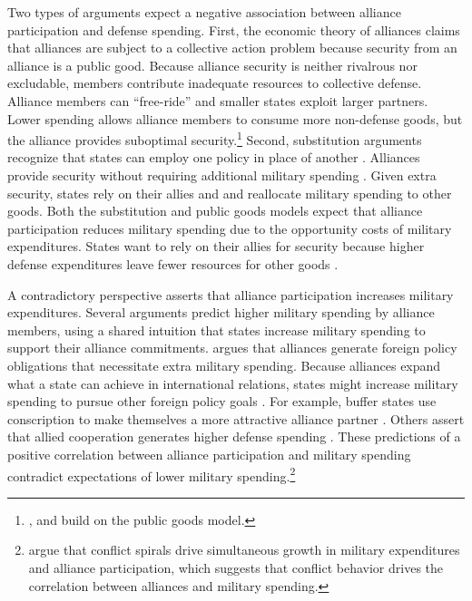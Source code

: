 \documentclass[12pt]{article}
\begin{document}
Two types of arguments expect a negative association between alliance participation and defense spending. 
First, the economic theory of alliances \citep{OlsonZeckhauser1966} claims that alliances are subject to a collective action problem because security from an alliance is a public good.
Because alliance security is neither rivalrous nor excludable, members contribute inadequate resources to collective defense. 
Alliance members can ``free-ride'' and smaller states exploit larger partners. 
Lower spending allows alliance members to consume more non-defense goods, but the alliance provides suboptimal security.\footnote{\citet{SandlerForbes1980}, \citet{Oneal1990} and \citet{SandlerHartley2001} build on the public goods model.} 
Second, substitution arguments recognize that states can employ one policy in place of another \citep{MostStarr1989}.
Alliances provide security without requiring additional military spending \citep{Morrow1993, Conybeare1994}. 
Given extra security, states rely on their allies and and reallocate military spending to other goods. 
Both the substitution and public goods models expect that alliance participation reduces military spending due to the opportunity costs of military expenditures. 
States want to rely on their allies for security because higher defense expenditures leave fewer resources for other goods \citep{Fordham1998, Fearon2018}.


A contradictory perspective asserts that alliance participation increases military expenditures. 
Several arguments predict higher military spending by alliance members, using a shared intuition that states increase military spending to support their alliance commitments. 
\citet{Diehl1994} argues that alliances generate foreign policy obligations that necessitate extra military spending.
Because alliances expand what a state can achieve in international relations, states might increase military spending to pursue other foreign policy goals \citep{MorganPalmer2006}.
For example, buffer states use conscription to make themselves a more attractive alliance partner \citep{Horowitzetal2017}.
Others assert that allied cooperation generates higher defense spending \citep{Palmer1990, QuirozFlores2011}. 
These predictions of a positive correlation between alliance participation and military spending contradict expectations of lower military spending.\footnote{
\citet{SeneseVasquez2008} argue that conflict spirals drive simultaneous growth in military expenditures and alliance participation, which suggests that conflict behavior drives the correlation between alliances and military spending. 
}
\end{document}
